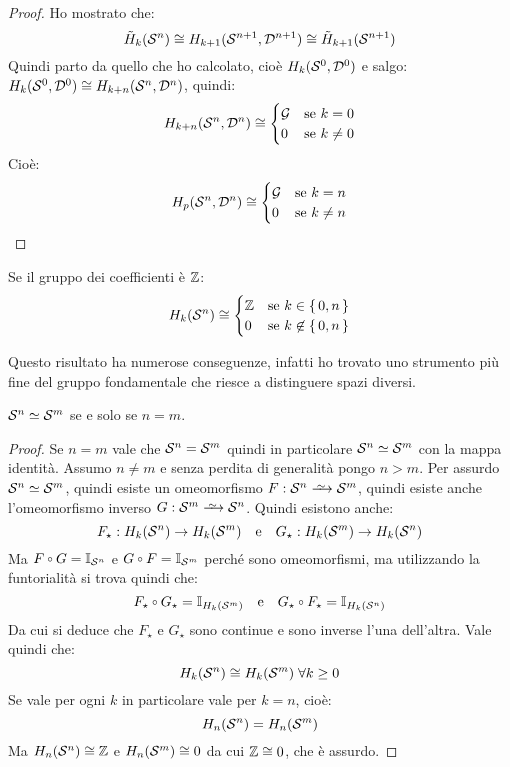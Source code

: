 \begin{proof}
  Ho mostrato che:
  \[
    \tilde{H}_k(\mathcal{S}^{n}) \cong H_{k+1}(\mathcal{S}^{n+1}, \mathcal{D}^{n+1}) \cong \tilde{H}_{k+1}(\mathcal{S}^{n+1})
  \]
  Quindi parto da quello che ho calcolato, cioè $ H_k(\mathcal{S}^{0}, \mathcal{D}^{0}) $ e salgo:
  $ H_k(\mathcal{S}^{0}, \mathcal{D}^{0}) \cong H_{k+n}(\mathcal{S}^{n}, \mathcal{D}^{n}) $, quindi:
  \[
    H_{k+n}(\mathcal{S}^{n}, \mathcal{D}^{n}) \cong
    \begin{cases}
      \mathcal{G} & \text{se } k = 0 \\
      0 & \text{se } k \not = 0
    \end{cases}
  \]
  Cioè:
  \[
    H_{p}(\mathcal{S}^{n}, \mathcal{D}^{n}) \cong
    \begin{cases}
      \mathcal{G} & \text{se } k = n \\
      0 & \text{se } k \not = n
    \end{cases}
  \]

\end{proof}


\begin{corollary}
  Se il gruppo dei coefficienti è $ \mathbb{Z} $:
  \[
    H_k(\mathcal{S}^{n}) \cong
    \begin{cases}
      \mathbb{Z} & \text{se } k \in \set{0, n} \\
      0 & \text{se } k \not \in \set{0, n}
    \end{cases}
  \]
\end{corollary}
Questo risultato ha numerose conseguenze, infatti ho trovato uno
strumento più fine del gruppo fondamentale che riesce a distinguere
spazi diversi.

\begin{corollary}
  $ \mathcal{S}^{n} \simeq \mathcal{S}^{m} $ se e solo se $ n = m $.
\end{corollary}
\begin{proof}
  Se $ n = m $ vale che $ \mathcal{S}^{n} = \mathcal{S}^{m} $ quindi in particolare
  $ \mathcal{S}^{n} \simeq \mathcal{S}^{m} $ con la mappa identità. Assumo $ n \not = m $ e senza
  perdita di generalità pongo $ n > m $. Per assurdo $ \mathcal{S}^{n} \simeq \mathcal{S}^{m} $,
  quindi esiste un omeomorfismo $ F: \Sph{n} \homoto \Sph{m} $, quindi esiste
  anche l'omeomorfismo inverso $ G: \Sph{m} \homoto \Sph{n} $. Quindi esistono
  anche:
  \[
    F_\star: H_k(\mathcal{S}^{n}) \to H_k(\mathcal{S}^{m}) \quad \text{e} \quad G_\star: H_k(\mathcal{S}^{m}) \to H_k(\mathcal{S}^{n})
  \]
  Ma $ F \circ G = \Id{\Sph{n}} $ e $ G \circ F = \Id{\Sph{m}} $ perché sono omeomorfismi,
  ma utilizzando la funtorialità si trova quindi che:
  \[
    F_\star \circ G_\star = \Id{H_k(\Sph{m})} \quad \text{e} \quad G_\star \circ F_\star = \Id{H_k(\Sph{n})}
  \]
  Da cui si deduce che $ F_\star $ e $ G_\star $ sono continue e sono inverse l'una
  dell'altra.
  Vale quindi che:
  \[
    H_k(\mathcal{S}^{n}) \cong H_k(\mathcal{S}^{m}) \; \forall k \geq 0
  \]
  Se vale per ogni $ k $ in particolare vale per $ k = n $, cioè:
  \[
    H_n(\mathcal{S}^{n}) = H_n(\mathcal{S}^{m})
  \]
  Ma $ H_n(\mathcal{S}^{n}) \cong \mathbb{Z} $ e $ H_n(\mathcal{S}^{m}) \cong 0 $ da cui $ \mathbb{Z} \cong 0 $, che è assurdo.
\end{proof}

